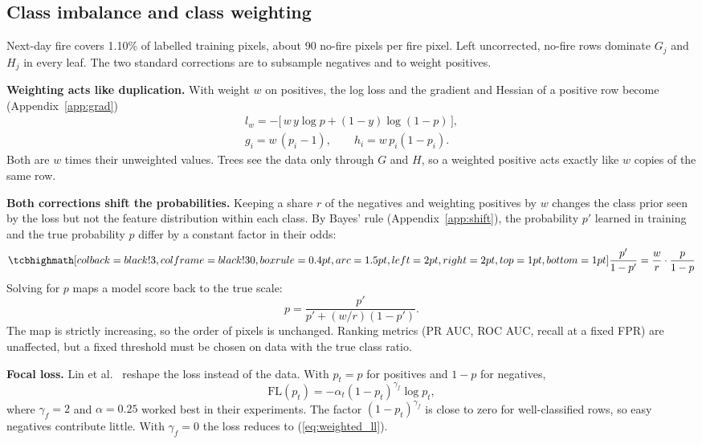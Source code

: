 \subsection{Class imbalance and class weighting}
\label{sec:theory_imb}

Next-day fire covers 1.10\% of labelled training pixels, about 90 no-fire pixels per fire pixel. Left
uncorrected, no-fire rows dominate $G_j$ and $H_j$ in every leaf. The two standard corrections are to
subsample negatives and to weight positives.

\textbf{Weighting acts like duplication.} With weight $w$ on positives, the log loss and the gradient and
Hessian of a positive row become (Appendix~\ref{app:grad})
\begin{gather}
l_w = -\big[\, w\, y \log p + (1 - y) \log(1-p) \,\big], \label{eq:weighted_ll}\\
g_i = w\,(p_i - 1), \qquad h_i = w\,p_i(1-p_i). \label{eq:weighted_gh}
\end{gather}
Both are $w$ times their unweighted values. Trees see the data only through $G$ and $H$, so a weighted
positive acts exactly like $w$ copies of the same row.

\textbf{Both corrections shift the probabilities.} Keeping a share $r$ of the negatives and weighting
positives by $w$ changes the class prior seen by the loss but not the feature distribution within each
class. By Bayes' rule (Appendix~\ref{app:shift}), the probability $p'$ learned in training and the true
probability $p$ differ by a constant factor in their odds:
\begin{equation}
\keyeq{\frac{p'}{1-p'} = \frac{w}{r}\cdot\frac{p}{1-p}}
\label{eq:prior_shift}
\end{equation}
Solving for $p$ maps a model score back to the true scale:
\begin{equation}
p = \frac{p'}{p' + (w/r)(1-p')} .
\label{eq:inverse_shift}
\end{equation}
The map is strictly increasing, so the order of pixels is unchanged. Ranking metrics (PR AUC, ROC AUC,
recall at a fixed FPR) are unaffected, but a fixed threshold must be chosen on data with the true class
ratio.

\textbf{Focal loss.} Lin et al.~\cite{lin2017} reshape the loss instead of the data. With $p_t = p$ for
positives and $1-p$ for negatives,
\begin{equation}
\mathrm{FL}(p_t) = -\alpha_t (1 - p_t)^{\gamma_f} \log p_t ,
\label{eq:focal}
\end{equation}
where $\gamma_f = 2$ and $\alpha = 0.25$ worked best in their experiments. The factor $(1-p_t)^{\gamma_f}$
is close to zero for well-classified rows, so easy negatives contribute little. With $\gamma_f = 0$ the
loss reduces to (\ref{eq:weighted_ll}).

